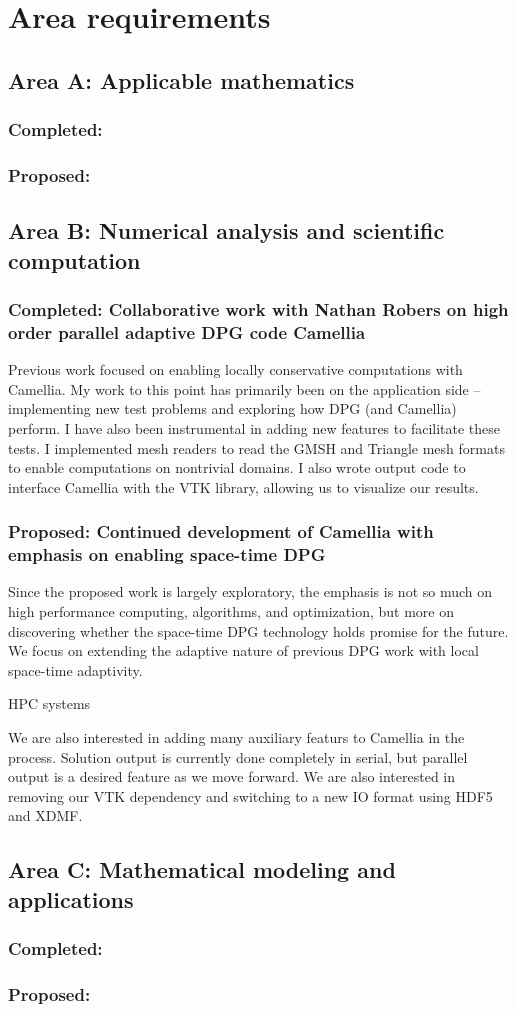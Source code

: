 \documentclass[Proposal.tex]{subfiles}
\begin{document}
\section{Area requirements}

\subsection{Area A: Applicable mathematics}
\subsubsection*{Completed:}
\subsubsection*{Proposed:}

\subsection{Area B: Numerical analysis and scientific computation}
\subsubsection*{Completed: Collaborative work with Nathan Robers on high order parallel adaptive DPG code Camellia}
Previous work focused on enabling locally conservative computations with Camellia. My work to this point has primarily been on the application side -- implementing new test problems and exploring how DPG (and Camellia) perform. I have also been instrumental in adding new features to facilitate these tests. I implemented mesh readers to read the GMSH and Triangle mesh formats to enable computations on nontrivial domains. I also wrote output code to interface Camellia with the VTK library, allowing us to visualize our results.
 \subsubsection*{Proposed: Continued development of Camellia with emphasis on enabling space-time DPG}
Since the proposed work is largely exploratory, the emphasis is not so much on high performance computing, algorithms, and optimization, but more on discovering whether the space-time DPG technology holds promise for the future. We focus on extending the adaptive nature of previous DPG work with local space-time adaptivity.

HPC systems

We are also interested in adding many auxiliary featurs to Camellia in the process. Solution output is currently done completely in serial, but parallel output is a desired feature as we move forward. We are also interested in removing our VTK dependency and switching to a new IO format using HDF5 and XDMF.

\subsection{Area C: Mathematical modeling and applications}
\subsubsection*{Completed:}
\subsubsection*{Proposed:}
\end{document}
